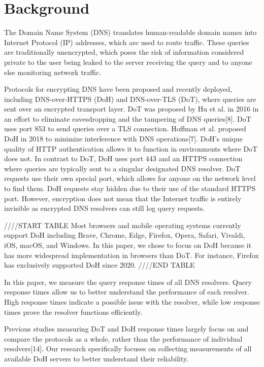 \section{Background}\label{sec:back}

The Domain Name System (DNS) translates human-readable domain names into Internet Protocol (IP) addresses, which are used to route traffic.
These queries are traditionally unencrypted, which poses the risk of information considered private to the user being leaked to the server receiving the query and to anyone else monitoring network traffic. 

Protocols for encrypting DNS have been proposed and recently deployed, including DNS-over-HTTPS (DoH) and DNS-over-TLS (DoT), where queries are sent over an encrypted transport layer.
DoT was proposed by Hu et al. in 2016 in an effort to eliminate eavesdropping and the tampering of DNS queries[8].
DoT uses port 853 to send queries over a TLS connection.
Hoffman et al. proposed DoH in 2018 to minimize interference with DNS operations[7].
DoH's unique quality of HTTP authentication allows it to function in environments where DoT does not.
In contrast to DoT, DoH uses port 443 and an HTTPS connection where queries are typically sent to a singular designated DNS resolver.
DoT requests use their own special port, which allows for anyone on the network level to find them.
DoH requests stay hidden due to their use of the standard HTTPS port.
However, encryption does not mean that the Internet traffic is entirely invisible as encrypted DNS resolvers can still log query requests.

////START TABLE
Most browsers and mobile operating systems currently support DoH including Brave, Chrome, Edge, Firefox, Opera, Safari, Vivaldi, iOS, macOS, and Windows.
In this paper, we chose to focus on DoH because it has more widespread implementation in browsers than DoT.
For instance, Firefox has exclusively supported DoH since 2020.
////END TABLE

In this paper, we measure the query response times of all DNS resolvers.
Query response times allow us to better understand the performance of each resolver.
High response times indicate a possible issue with the resolver, while low response times prove the resolver functions efficiently.

Previous studies measuring DoT and DoH response times largely focus on and compare the protocols as a whole, rather than the performance of individual resolvers[14].
Our research specifically focuses on collecting measurements of all available DoH servers to better understand their reliability.
